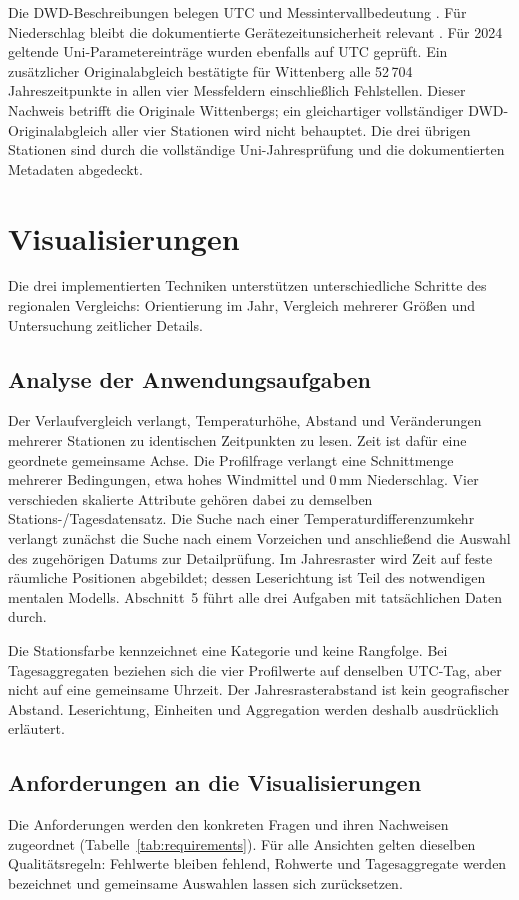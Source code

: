 \documentclass[usegeometry=true]{scrartcl}
\begin{document}
Die DWD-Beschreibungen belegen UTC und Messintervallbedeutung
\autocite[jeweils~S.~2]{dwd2024temperature,dwd2024wind}.
Für Niederschlag bleibt die dokumentierte Gerätezeitunsicherheit relevant
\autocite[S.~2--3]{dwd2024precipitation}.
Für 2024 geltende Uni-Parametereinträge wurden ebenfalls auf UTC geprüft.
Ein zusätzlicher Originalabgleich bestätigte für Wittenberg alle
52\,704 Jahreszeitpunkte in allen vier Messfeldern einschließlich
Fehlstellen. Dieser Nachweis betrifft die Originale Wittenbergs;
ein gleichartiger vollständiger DWD-Originalabgleich aller vier Stationen
wird nicht behauptet. Die drei übrigen Stationen sind durch die
vollständige Uni-Jahresprüfung und die dokumentierten Metadaten abgedeckt.

\section{Visualisierungen}
Die drei implementierten Techniken unterstützen unterschiedliche Schritte des
regionalen Vergleichs: Orientierung im Jahr, Vergleich mehrerer Größen und
Untersuchung zeitlicher Details.
\subsection{Analyse der Anwendungsaufgaben}
Der Verlaufvergleich verlangt, Temperaturhöhe, Abstand und Veränderungen
mehrerer Stationen zu identischen Zeitpunkten zu lesen. Zeit ist dafür
eine geordnete gemeinsame Achse. Die Profilfrage verlangt eine Schnittmenge
mehrerer Bedingungen, etwa hohes Windmittel und 0\,mm Niederschlag.
Vier verschieden skalierte Attribute gehören dabei zu demselben
Stations-/Tagesdatensatz. Die Suche nach einer Temperaturdifferenzumkehr
verlangt zunächst die Suche nach einem Vorzeichen und anschließend die
Auswahl des zugehörigen Datums zur Detailprüfung. Im Jahresraster wird
Zeit auf feste räumliche Positionen abgebildet; dessen Leserichtung
ist Teil des notwendigen mentalen Modells. Abschnitt~5 führt alle drei
Aufgaben mit tatsächlichen Daten durch.

Die Stationsfarbe kennzeichnet eine Kategorie und keine Rangfolge.
Bei Tagesaggregaten beziehen sich die vier Profilwerte auf denselben
UTC-Tag, aber nicht auf eine gemeinsame Uhrzeit. Der Jahresrasterabstand
ist kein geografischer Abstand. Leserichtung, Einheiten und Aggregation
werden deshalb ausdrücklich erläutert.
\subsection{Anforderungen an die Visualisierungen}
Die Anforderungen werden den konkreten Fragen und ihren Nachweisen
zugeordnet (Tabelle~\ref{tab:requirements}). Für alle Ansichten gelten
dieselben Qualitätsregeln: Fehlwerte bleiben fehlend, Rohwerte und
Tagesaggregate werden bezeichnet und gemeinsame Auswahlen lassen sich
zurücksetzen.
\end{document}
